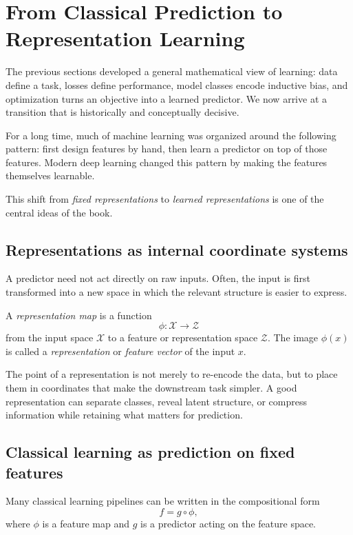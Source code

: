 \section{From Classical Prediction to Representation Learning}

The previous sections developed a general mathematical view of learning: data define a task, losses define performance, model classes encode inductive bias, and optimization turns an objective into a learned predictor. We now arrive at a transition that is historically and conceptually decisive.

For a long time, much of machine learning was organized around the following pattern: first design features by hand, then learn a predictor on top of those features. Modern deep learning changed this pattern by making the features themselves learnable.

This shift from \emph{fixed representations} to \emph{learned representations} is one of the central ideas of the book.

\subsection*{Representations as internal coordinate systems}

A predictor need not act directly on raw inputs. Often, the input is first transformed into a new space in which the relevant structure is easier to express.

\begin{definition}
A \emph{representation map} is a function
\[
\phi:\mathcal X\to\mathcal Z
\]
from the input space $\mathcal X$ to a feature or representation space $\mathcal Z$. The image $\phi(x)$ is called a \emph{representation} or \emph{feature vector} of the input $x$.
\end{definition}

The point of a representation is not merely to re-encode the data, but to place them in coordinates that make the downstream task simpler. A good representation can separate classes, reveal latent structure, or compress information while retaining what matters for prediction.

\subsection*{Classical learning as prediction on fixed features}

Many classical learning pipelines can be written in the compositional form
\[
f = g\circ \phi,
\]
where $\phi$ is a feature map and $g$ is a predictor acting on the feature space.

